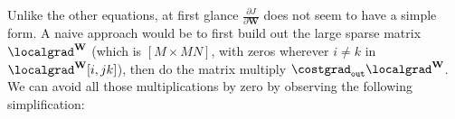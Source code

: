 Unlike the other equations, at first glance $\frac{\partial J}{\partial \mathbf{W}}$ does not seem to have a simple form. A naive approach would be to first build out the large sparse matrix $\localgrad^{\mathbf{W}}$ (which is $[M \times MN]$, with zeros wherever $i \neq k$ in $\localgrad^\mathbf{W}[i,jk]$), then do the matrix multiply $\costgrad_{\texttt{out}}\localgrad^{\mathbf{W}}$. We can avoid all those multiplications by zero by observing the following simplification:


